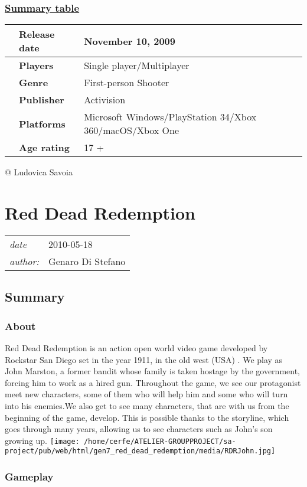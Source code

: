 \documentclass[a4paper,10pt]{book}
\newcommand{\pageHeader}[4]{
    \section{#1}
    \vspace{-0.3cm}
    \begin{table}[h!]
     \begin{tabular}{ll}
        \hline
        \textit{date} & #2 \\
        \textit{author: } & #3\\
        \hline
     \end{tabular}
    \end{table}
    \vspace{-0.3cm}
}
\begin{document}
 \subsubsection{\underline{Summary table }}
 \begin{longtable}{p{1mm}|l|l|}\hline
 
 & \textbf{Release date } 
 & November 10, 2009 
 \\\hline
 
 & \textbf{Players } 
 & Single player/Multiplayer 
 \\\hline
 
 & \textbf{Genre } 
 & First-person Shooter 
 \\\hline
 
 & \textbf{Publisher } 
 & Activision 
 \\\hline
 
 & \textbf{Platforms } 
 & Microsoft Windows/PlayStation 34/Xbox 360/macOS/Xbox One 
 \\\hline
 
 & \textbf{Age rating } 
 & 17 + 
 \\\hline
 \end{longtable}
 
 @ Ludovica Savoia 
 
 \newpage\pageHeader{Red Dead Redemption}{2010-05-18}{Genaro Di Stefano}{A realistic wild west game}
 \subsection{Summary }
 \subsubsection{About }
 
          Red Dead Redemption is an action open world video game developed by Rockstar San Diego set in the year 1911, in the old west (USA) . We play as John Marston, a former bandit whose family is taken hostage by the government, forcing him to work as a hired gun. Throughout the game, we see our protagonist meet new characters, some of them who will help him and some who will turn into his enemies.We also get to see many characters, that are with us from the beginning of the game, develop. This is possible thanks to the storyline, which goes through many years, allowing us to see characters such as John's son growing up.
             \texttt{[image: /home/cerfe/ATELIER-GROUPPROJECT/sa-project/pub/web/html/gen7\_red\_dead\_redemption/media/RDRJohn.jpg]}
 \subsubsection{Gameplay }
 
\end{document}
